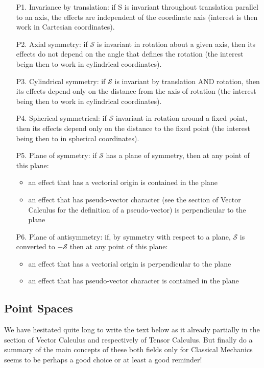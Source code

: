 	\begin{enumerate}
		\item[P1.] Invariance by translation: if S is invariant throughout translation parallel to an axis, the effects are independent of the coordinate axis (interest is then work in Cartesian coordinates).

		\item[P2.] Axial symmetry: if $\mathcal{S}$ is invariant in rotation about a given axis, then its effects do not depend on the angle that defines the rotation (the interest beign then to work in cylindrical coordinates).

		\item[P3.] Cylindrical symmetry: if $\mathcal{S}$  is invariant by translation AND rotation, then its effects depend only on the distance from the axis of rotation (the interest being then to work in cylindrical coordinates).

		\item[P4.] Spherical symmetrical: if $\mathcal{S}$ invariant in rotation around a fixed point, then its effects depend only on the distance to the fixed point (the interest being then to in spherical coordinates).

		\item[P5.] Plane of symmetry: if $\mathcal{S}$ has a plane of symmetry, then at any point of this plane:
		\begin{itemize}
			\item an effect that has a vectorial origin is contained in the plane

			\item an effect that has pseudo-vector character  (see the section of Vector Calculus for the definition of a pseudo-vector) is perpendicular to the plane
		\end{itemize}

		\item[P6.] Plane of antisymmetry: if, by symmetry with respect to a plane,  $\mathcal{S}$ is converted to  $-\mathcal{S}$ then at any point of this plane:
		\begin{itemize}
			\item  an effect that has a vectorial origin is perpendicular to the plane

			\item an effect that has pseudo-vector character is contained in the plane  
		\end{itemize}
	\end{enumerate}
	
	\subsection{Point Spaces}
	We have hesitated quite long to write the text below as it already partially in the section of Vector Calculus and respectively of Tensor Calculus. But finally do a summary of the main concepts of these both fields only for Classical Mechanics seems to be perhaps a good choice or at least a good reminder!
	
